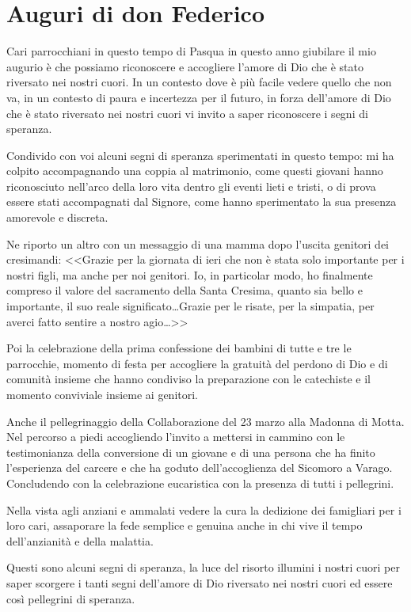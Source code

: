 \section{Auguri di don Federico}

Cari parrocchiani in questo tempo di Pasqua in questo anno giubilare il mio augurio è che possiamo riconoscere e accogliere l'amore di Dio che è stato riversato nei nostri cuori. In un contesto dove è più facile vedere quello che non va, in un contesto di paura e incertezza per il futuro, in forza dell'amore di Dio che è stato riversato nei nostri cuori vi invito a saper riconoscere i segni di speranza.

Condivido con voi alcuni segni di speranza sperimentati in questo tempo: mi ha colpito accompagnando una coppia al matrimonio, come questi giovani hanno riconosciuto nell'arco della loro vita dentro gli eventi lieti e tristi, o di prova essere stati accompagnati dal Signore, come hanno sperimentato la sua presenza amorevole e discreta.

Ne riporto un altro con un messaggio di una mamma dopo l'uscita genitori dei cresimandi: <<Grazie per la giornata di ieri che non è stata solo importante per i nostri figli, ma anche per noi genitori. Io, in particolar modo, ho finalmente compreso il valore del sacramento della Santa Cresima, quanto sia bello e importante, il suo reale significato\ldots Grazie per le risate, per la simpatia, per averci fatto sentire a nostro agio\ldots>>

Poi la celebrazione della prima confessione dei bambini di tutte e tre le parrocchie, momento di festa per accogliere la gratuità del perdono di Dio e di comunità insieme che hanno condiviso la preparazione con le catechiste e il momento conviviale insieme ai genitori.

Anche il pellegrinaggio della Collaborazione del 23 marzo alla Madonna di Motta. Nel percorso a piedi accogliendo l'invito a mettersi in cammino con le testimonianza della conversione di un giovane e di una persona che ha finito l'esperienza del carcere e che ha goduto dell'accoglienza del Sicomoro a Varago. Concludendo con la celebrazione eucaristica con la presenza di tutti i pellegrini.

Nella vista agli anziani e ammalati vedere la cura la dedizione dei famigliari per i loro cari, assaporare la fede semplice e genuina anche in chi vive il tempo dell'anzianità e della malattia.

Questi sono alcuni segni di speranza, la luce del risorto illumini i nostri cuori per saper scorgere i tanti segni dell'amore di Dio riversato nei nostri cuori ed essere così pellegrini di speranza.

